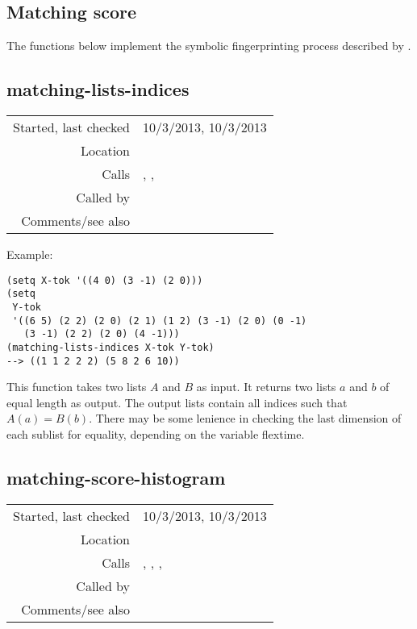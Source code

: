 \subsection{Matching score}\label{sec:matching-score}

The functions below implement the
symbolic fingerprinting process described by
\cite{arzt2012}.


\subsection*{matching-lists-indices}\label{fun:matching-lists-indices}

\vspace{0.3cm}
\begin{tabular}{r|p{8cm}}
Started, last checked & 10/3/2013, 10/3/2013 \\
Location & \nameref{sec:matching-score} \\
Calls & \nameref{fun:constant-vector}, \nameref{fun:positions},\newline \nameref{fun:positions-last-within-c} \\
Called by & \nameref{fun:matching-score-histogram} \\
Comments/see also &
\end{tabular}

\vspace{0.5cm}
\noindent Example:
\begin{verbatim}
(setq X-tok '((4 0) (3 -1) (2 0)))
(setq
 Y-tok
 '((6 5) (2 2) (2 0) (2 1) (1 2) (3 -1) (2 0) (0 -1)
   (3 -1) (2 2) (2 0) (4 -1)))
(matching-lists-indices X-tok Y-tok)
--> ((1 1 2 2 2) (5 8 2 6 10))
\end{verbatim}

\noindent This function takes two lists $A$ and $B$ as
input. It returns two lists $a$ and $b$ of equal
length as output. The output lists contain all indices
such that $A(a) = B(b)$. There may be some lenience in
checking the last dimension of each sublist for
equality, depending on the variable flextime.


\subsection*{matching-score-histogram}\label{fun:matching-score-histogram}

\vspace{0.3cm}
\begin{tabular}{r|p{8cm}}
Started, last checked & 10/3/2013, 10/3/2013 \\
Location & \nameref{sec:matching-score} \\
Calls & \nameref{fun:histogram}, \nameref{fun:matching-lists-indices}, \nameref{fun:max-item},\newline \nameref{fun:nth-list-of-lists} \\
Called by & \nameref{fun:matching-score} \\
Comments/see also &
\end{tabular}


